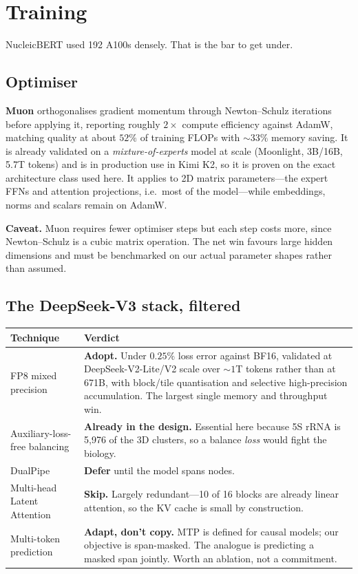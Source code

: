 \documentclass[11pt,a4paper]{article}
\begin{document}
\section{Training}
\label{sec:training}

NucleicBERT used 192 A100s densely. That is the bar to get under.

\subsection{Optimiser}
\textbf{Muon} orthogonalises gradient momentum through Newton--Schulz iterations
before applying it, reporting roughly $2\times$ compute efficiency against AdamW,
matching quality at about $52\%$ of training FLOPs with $\sim33\%$ memory saving.
It is already validated on a \emph{mixture-of-experts} model at scale (Moonlight,
3B/16B, 5.7T tokens) and is in production use in Kimi K2, so it is proven on the
exact architecture class used here. It applies to 2D matrix parameters---the
expert FFNs and attention projections, i.e.\ most of the model---while
embeddings, norms and scalars remain on AdamW.

\textcolor{risk}{\textbf{Caveat.}} Muon requires fewer optimiser steps but each
step costs more, since Newton--Schulz is a cubic matrix operation. The net win
favours large hidden dimensions and must be benchmarked on our actual parameter
shapes rather than assumed.

\subsection{The DeepSeek-V3 stack, filtered}

\begin{table}[h]
\centering
\small
\begin{tabular}{@{}>{\raggedright\arraybackslash}p{4.2cm}>{\raggedright\arraybackslash}p{10.2cm}@{}}
\toprule
\textbf{Technique} & \textbf{Verdict} \\
\midrule
FP8 mixed precision & \textbf{Adopt.} Under $0.25\%$ loss error against BF16, validated at DeepSeek-V2-Lite/V2 scale over ${\sim}1$T tokens rather than at 671B, with block/tile quantisation and selective high-precision accumulation. The largest single memory and throughput win. \\
Auxiliary-loss-free balancing & \textbf{Already in the design.} Essential here because 5S rRNA is 5{,}976 of the 3D clusters, so a balance \emph{loss} would fight the biology. \\
DualPipe & \textbf{Defer} until the model spans nodes. \\
Multi-head Latent Attention & \textbf{Skip.} Largely redundant---10 of 16 blocks are already linear attention, so the KV cache is small by construction. \\
Multi-token prediction & \textbf{Adapt, don't copy.} MTP is defined for causal models; our objective is span-masked. The analogue is predicting a masked span jointly. Worth an ablation, not a commitment. \\
\bottomrule
\end{tabular}
\end{table}
\end{document}
